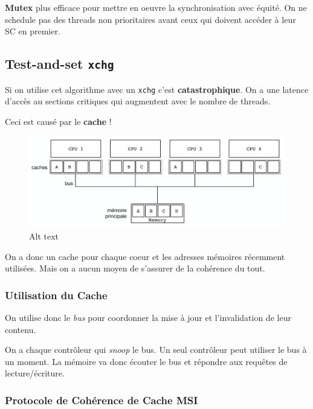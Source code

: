 \textbf{Mutex} plus efficace pour mettre en oeuvre la synchronisation
avec équité. On ne schedule pas des threads non prioritaires avant ceux
qui doivent accéder à leur SC en premier.

\subsection{\texorpdfstring{Test-and-set
\texttt{xchg}}{Test-and-set xchg}}\label{test-and-set-xchg}

Si on utilise cet algorithme avec un \texttt{xchg} c'est
\textbf{catastrophique}. On a une latence d'accès au sections critiques
qui augmentent avec le nombre de threads.

Ceci est causé par le \textbf{cache} !

\begin{figure}
\centering
\includegraphics{image-28-1.png}
\caption{Alt text}
\end{figure}

On a donc un cache pour chaque coeur et les adresses mémoires récemment
utilisées. Mais on a aucun moyen de s'assurer de la cohérence du tout.

\subsubsection{Utilisation du Cache}\label{utilisation-du-cache}

On utilise donc le \emph{bus} pour coordonner la mise à jour et
l'invalidation de leur contenu.

On a chaque contrôleur qui \emph{snoop} le bus. Un seul contrôleur peut
utiliser le bus à un moment. La mémoire va donc écouter le bus et
répondre aux requêtes de lecture/écriture.

\subsubsection{Protocole de Cohérence de Cache
MSI}\label{protocole-de-cohuxe9rence-de-cache-msi}


